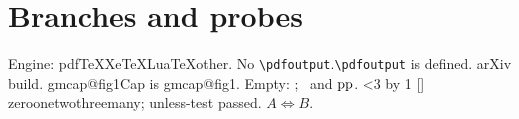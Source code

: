 \section{Branches and probes}
Engine: \ifPDFTeX pdfTeX\else\ifXeTeX XeTeX\else\ifLuaTeX LuaTeX\else other\fi\fi\fi.
\ifx\pdfoutput\undefined No \verb|\pdfoutput|.\else \verb|\pdfoutput| is defined.\fi
\ifdefined\gmarxiv arXiv build.\else\newpage\fi
\iftoggle{gmtoggle}{Toggle on.}{Toggle off.}
\ifcsname gmcap@fig1\endcsname Cap is \csname gmcap@fig1\endcsname.\fi
Empty: ; \gmpp\ and $\gmpp$.
\newcount\gmn
{}
\loop\ifnum\gmn<3 \advance\gmn by 1 [\the\gmn]\repeat
\ifcase\gmn zero\or one\or two\or three\else many\fi;
\unless\ifdefined\gmundefinedflag unless-test passed\fi.
$A \iff B$.
